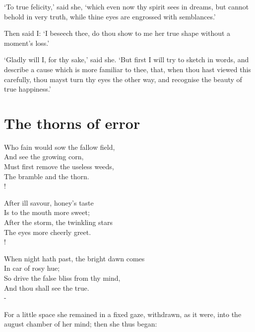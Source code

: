 \documentclass[12pt]{book}
\newenvironment{vpoem}[1]%
  {\def\poemvsindentlines{#1}\begin{poem}\small}%
  {\end{poem}\def\poemvsindentlines{\relax}}
\begin{document}
`To true felicity,' said she, `which even now thy spirit sees in dreams,
but cannot behold in very truth, while thine eyes are engrossed with
semblances.'

Then said I: `I beseech thee, do thou show to me her true shape without
a moment's loss.'

`Gladly will I, for thy sake,' said she. `But first I will try to sketch
in words, and describe a cause which is more familiar to thee, that,
when thou hast viewed this carefully, thou mayst turn thy eyes the other
way, and recognise the beauty of true happiness.'




\section{The thorns of error}

\begin{vpoem}{24}
    Who fain would sow the fallow field, \\
      And see the growing corn, \\
    Must first remove the useless weeds, \\
      The bramble and the thorn. \\!

    After ill savour, honey's taste \\
      Is to the mouth more sweet; \\
    After the storm, the twinkling stars \\
      The eyes more cheerly greet. \\!

    When night hath past, the bright dawn comes \\
      In car of rosy hue; \\
    So drive the false bliss from thy mind, \\
      And thou shall see the true. \\-
\end{vpoem}


For a little space she remained in a fixed gaze, withdrawn, as it were,
into the august chamber of her mind; then she thus began:
\end{document}
